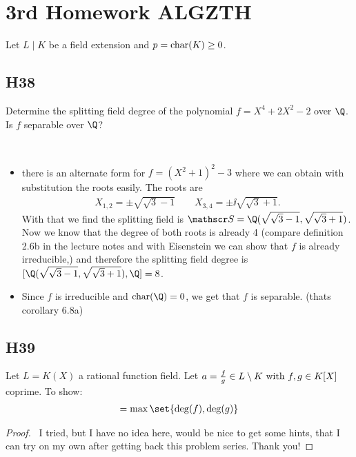 
\section{3rd Homework ALGZTH}
Let $L\mid K$ be a field extension and $p = \operatorname{char}(K) \ge 0$.
\subsection{H38}
Determine the splitting field degree of the polynomial $f = X^4 +2X^2 -2$ over $\Q$. Is $f$ separable over $\Q$?
\begin{solution}\
	\begin{itemize}
		\item there is an alternate form  for $f = (X^2+1)^2-3$ where we can obtain with substitution the roots easily. The roots are
		\begin{align*}
			X_{1,2} = \pm \sqrt{\sqrt{3}-1} \qquad X_{3,4} = \pm \ii\sqrt{\sqrt{3}+1}.
		\end{align*}
		With that we find the splitting field is $\Split = \Q(\sqrt{\sqrt{3}-1}, \sqrt{\sqrt{3}+1})$. Now we know that the degree of both roots is already 4 (compare definition 2.6b in the lecture notes and with Eisenstein we can show that $f$ is already irreducible,) and therefore the splitting field degree is $[\Q(\sqrt{\sqrt{3}-1}, \sqrt{\sqrt{3}+1}), \Q] = 8$.\\ 
		\item Since $f$ is irreducible and $\chara(\Q) = 0$, we get that $f$ is separable. (thats corollary 6.8a)
	\end{itemize}
\end{solution}

\subsection{H39}
Let $L = K(X)$ a rational function field. Let $a = \frac{f}{g} \in L \setminus K \text{ with } f,g \in K[X]$ coprime. To show:
\begin{align*}
	[L:K(a)] = \max\set{\deg(f),\deg(g)}
\end{align*}
\begin{proof}\
	I tried, but I have no idea here, would be nice to get some hints, that I can try on my own after getting back this problem series. Thank you!
\end{proof}

